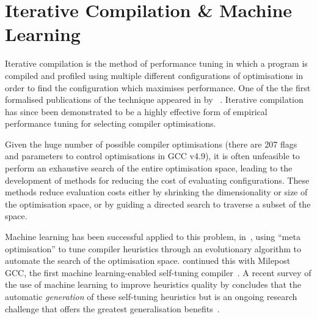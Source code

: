 \section{Iterative Compilation \& Machine
Learning}\label{sec:iterative-compilation}

Iterative compilation is the method of performance tuning in which a
program is compiled and profiled using multiple different
configurations of optimisations in order to find the configuration
which maximises performance. One of the the first formalised
publications of the technique appeared in \citeyear{Bodin1998} by
\citeauthor{Bodin1998}~\cite{Bodin1998}. Iterative compilation has
since been demonstrated to be a highly effective form of empirical
performance tuning for selecting compiler optimisations.

Given the huge number of possible compiler optimisations (there are
207 flags and parameters to control optimisations in GCC v4.9), it is
often unfeasible to perform an exhaustive search of the entire
optimisation space, leading to the development of methods for reducing
the cost of evaluating configurations. These methods reduce evaluation
costs either by shrinking the dimensionality or size of the
optimisation space, or by guiding a directed search to traverse a
subset of the space.

Machine learning has been successful applied to this problem,
in~\cite{Stephenson2003}, using ``meta optimisation'' to tune compiler
heuristics through an evolutionary algorithm to automate the search of
the optimisation space. \citeauthor{Fursin2011} continued this with
Milepost GCC, the first machine learning-enabled self-tuning
compiler~\cite{Fursin2011}. A recent survey of the use of machine
learning to improve heuristics quality by \citeauthor{Burke2013}
concludes that the automatic \emph{generation} of these self-tuning
heuristics but is an ongoing research challenge that offers the
greatest generalisation benefits~\cite{Burke2013}.




